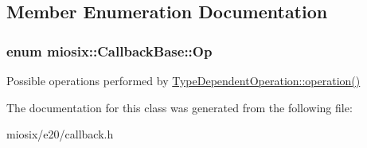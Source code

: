 \subsection{Member Enumeration Documentation}
\hypertarget{classmiosix_1_1_callback_base_a8f24acb613ae030f034ff390a265141b}{
\subsubsection[{Op}]{\setlength{\rightskip}{0pt plus 5cm}enum {\bf miosix\-::\-Callback\-Base\-::\-Op}\hspace{0.3cm}{\ttfamily [protected]}}}\label{classmiosix_1_1_callback_base_a8f24acb613ae030f034ff390a265141b}
Possible operations performed by \hyperlink{classmiosix_1_1_callback_base_1_1_type_dependent_operation_a5ba074f1fc67345b5771312cbea7af63}{Type\-Dependent\-Operation\-::operation()} 

The documentation for this class was generated from the following file\-:\begin{DoxyCompactItemize}
\item 
miosix/e20/callback.\-h\end{DoxyCompactItemize}
